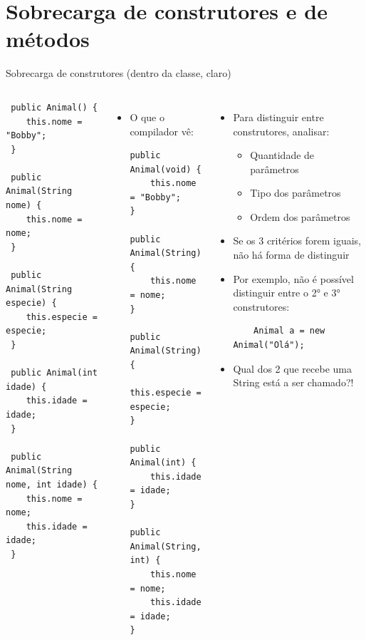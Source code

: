 \documentclass[portuguese, aspectratio=169, xcolor=table]{beamer}
\begin{document}
\section{Sobrecarga de construtores e de métodos}

\begin{frame}[fragile]{Sobrecarga de construtores (dentro da classe, claro)}
\begin{columns}
\scriptsize
\begin{verbatim}
 public Animal() {
    this.nome = "Bobby";
 }

 public Animal(String nome) {
    this.nome = nome;
 }

 public Animal(String especie) {
    this.especie = especie;
 }

 public Animal(int idade) {
    this.idade = idade;
 }

 public Animal(String nome, int idade) {
    this.nome = nome;
    this.idade = idade;
 }
\end{verbatim}

\scriptsize
\begin{itemize}
\item O que o compilador vê:
\begin{verbatim}
public Animal(void) {
    this.nome = "Bobby";
}

public Animal(String) {
    this.nome = nome;
}

public Animal(String) {
    this.especie = especie;
}

public Animal(int) {
    this.idade = idade;
}

public Animal(String, int) {
    this.nome = nome;
    this.idade = idade;
}
\end{verbatim}
\end{itemize}

\scriptsize
\begin{itemize}
\item Para distinguir entre construtores, analisar:
\begin{itemize}
    \scriptsize
    \item Quantidade de parâmetros
    \item Tipo dos parâmetros
    \item Ordem dos parâmetros
\end{itemize}
\item Se os 3 critérios forem iguais, não há forma de distinguir
\item Por exemplo, não é possível distinguir entre o 2° e 3° construtores:
\begin{verbatim}
    Animal a = new Animal("Olá");
\end{verbatim}
\item Qual dos 2 que recebe uma String está a ser chamado?!
\end{itemize}
\end{columns}
\end{frame}
\end{document}
